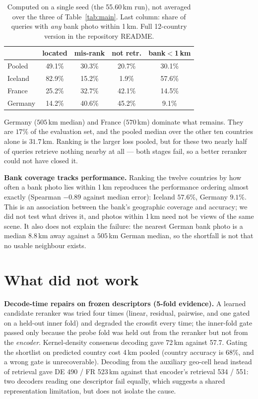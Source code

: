 \documentclass[10pt,a4paper,twocolumn]{article}
\begin{document}
\begin{table}[h]
\centering\footnotesize
\setlength{\tabcolsep}{4pt}
\begin{tabular}{lcccc}
\toprule
& located & mis-rank & not retr. & bank$<$1\,km \\
\midrule
Pooled  & 49.1\% & 30.3\% & 20.7\% & 30.1\% \\
Iceland & 82.9\% & 15.2\% & \phantom{0}1.9\% & 57.6\% \\
France  & 25.2\% & 32.7\% & 42.1\% & 14.5\% \\
Germany & 14.2\% & 40.6\% & 45.2\% & \phantom{0}9.1\% \\
\bottomrule
\end{tabular}
\caption{Computed on a single seed (the 55.60\,km run), not averaged over the
three of Table~\ref{tab:main}. Last column: share of queries with \emph{any}
bank photo within 1\,km. Full 12-country version in the repository README.}
\label{tab:decomp}
\end{table}

Germany ($505$\,km median) and France ($570$\,km) dominate what remains. They
are $17\%$ of the evaluation set, and the pooled median over the other ten
countries alone is $\mathbf{31.7}$\,km. Ranking is the larger loss pooled, but
for these two nearly half of queries retrieve nothing nearby at all --- both
stages fail, so a better reranker could not have closed it.

\textbf{Bank coverage tracks performance.} Ranking the twelve countries by how
often a bank photo lies within 1\,km reproduces the performance ordering almost
exactly (Spearman $-0.89$ against median error): Iceland $57.6\%$, Germany
$9.1\%$. This is an association between the bank's geographic coverage and
accuracy; we did not test what drives it, and photos within 1\,km need not be
views of the same scene. It also does not explain the failure: the nearest
German bank photo is a median $8.8$\,km away against a $505$\,km German median,
so the shortfall is not that no usable neighbour exists.

\section{What did not work}

\textbf{Decode-time repairs on frozen descriptors (5-fold evidence).} A learned
candidate reranker was tried four times (linear, residual, pairwise, and one
gated on a held-out inner fold) and degraded the crossfit every time; the
inner-fold gate passed only because the probe fold was held out from the
reranker but not from the \emph{encoder}. Kernel-density consensus decoding
gave 72\,km against 57.7. Gating the shortlist on predicted country cost 4\,km
pooled (country accuracy is 68\%, and a wrong gate is unrecoverable). Decoding
from the auxiliary geo-cell head instead of retrieval gave DE 490 / FR 523\,km
against that encoder's retrieval 534 / 551: two decoders reading one descriptor
fail equally, which suggests a shared representation limitation, but does not
isolate the cause.
\end{document}
